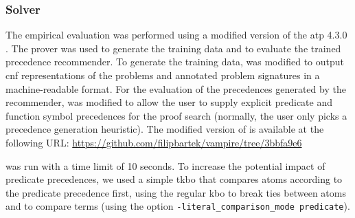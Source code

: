 \subsubsection{Solver}

The empirical evaluation was performed using a modified version of the \gls{atp} \Vampire{} 4.3.0 \cite{10.1007/978-3-642-39799-8_1}.
The prover was used to generate the training data and to evaluate the trained precedence recommender.
To generate the training data,
\Vampire{} was modified to output \gls{cnf} representations of the problems
and annotated problem signatures in a machine-readable format.
For the evaluation of the precedences generated by the recommender,
\Vampire{} was modified to allow the user to supply explicit predicate and function symbol precedences for the proof search
(normally, the user only picks a precedence generation heuristic).
The modified version of \Vampire{} is available at the following URL:
\url{https://github.com/filipbartek/vampire/tree/3bbfa9e6} 

\Vampire{} was run with a time limit of 10 seconds.
To increase the potential impact of predicate precedences,
we used a simple \gls{tkbo} \cite{Ludwig2007,Kovacs2011}
that compares atoms according to the predicate precedence first,
using the regular \gls{kbo} to break ties between atoms
and to compare terms (using the \Vampire{} option \texttt{-literal\_comparison\_mode predicate}).




